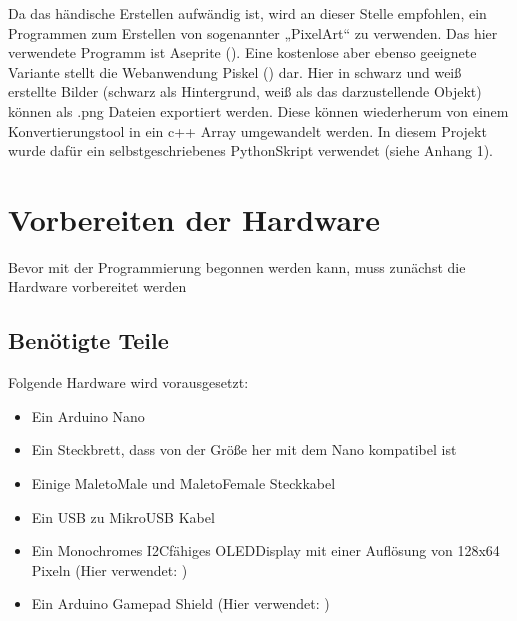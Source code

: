 \documentclass[letterpaper,10pt,ngerman]{sphinxmanual}
\begin{document}
Da das händische Erstellen aufwändig ist, wird an dieser Stelle empfohlen, ein
Programmen zum Erstellen von sogenannter „Pixel\sphinxhyphen{}Art“ zu verwenden. Das
hier verwendete Programm ist Aseprite ().
Eine kostenlose aber ebenso geeignete Variante stellt die Webanwendung Piskel
() dar. Hier in schwarz und weiß erstellte Bilder
(schwarz als Hintergrund, weiß als das darzustellende Objekt) können als .png
Dateien exportiert werden. Diese können wiederherum von einem
Konvertierungstool in ein c++ Array umgewandelt werden. In diesem Projekt wurde
dafür ein selbstgeschriebenes Python\sphinxhyphen{}Skript verwendet (siehe Anhang 1).


\chapter{Vorbereiten der Hardware}
\label{\detokenize{hardware:vorbereiten-der-hardware}}\label{\detokenize{hardware::doc}}
Bevor mit der Programmierung begonnen werden kann, muss zunächst die Hardware
vorbereitet werden


\section{Benötigte Teile}
\label{\detokenize{hardware:benotigte-teile}}
Folgende Hardware wird vorausgesetzt:
\begin{itemize}
\item {} 
Ein Arduino Nano

\item {} 
Ein Steckbrett, dass von der Größe her mit dem Nano kompatibel ist

\item {} 
Einige Male\sphinxhyphen{}to\sphinxhyphen{}Male und Male\sphinxhyphen{}to\sphinxhyphen{}Female Steckkabel

\item {} 
Ein USB zu Mikro\sphinxhyphen{}USB Kabel

\item {} 
Ein Monochromes I2C\sphinxhyphen{}fähiges OLED\sphinxhyphen{}Display mit einer Auflösung von 128x64
Pixeln (Hier verwendet: )

\item {} 
Ein Arduino Gamepad Shield (Hier verwendet: )

\end{itemize}
\end{document}
